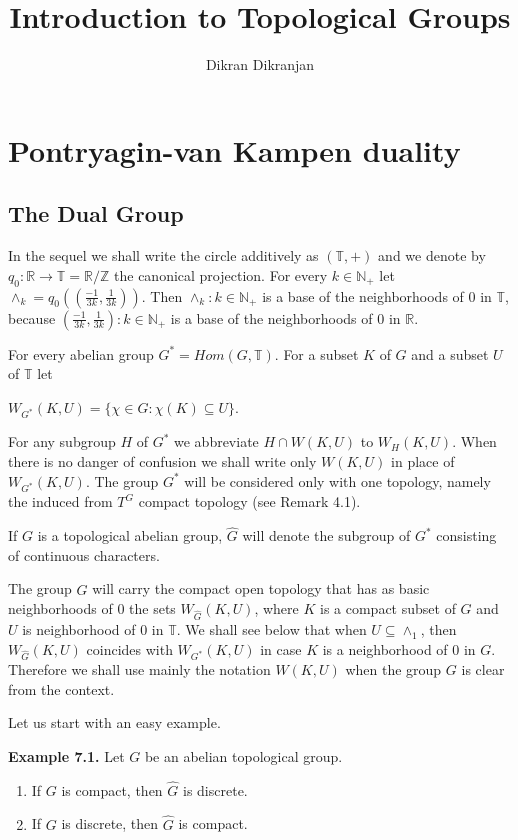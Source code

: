 \documentclass[12pt]{article}
\title{Introduction to Topological Groups}
\author{Dikran Dikranjan}
\begin{document}
\section{Pontryagin-van Kampen duality}

\subsection{The Dual Group}


In the sequel we shall write the circle additively as $(\mathbb{T}, +)$ and we denote by $q_0 : \mathbb{R} \to \mathbb{T} = \mathbb{R}/\mathbb{Z}$ the canonical
projection. For every $k \in \mathbb{N}_+$ let $\wedge_k = q_0((\frac{-1}{3k},\frac{1}{3k}))$. Then ${\wedge_k : k \in \mathbb{N}_+}$ is a base of the neighborhoods of 0
in $\mathbb{T}$, because ${(\frac{-1}{3k}, \frac{1}{3k}) : k \in \mathbb{N}_+}$ is a base of the neighborhoods of 0 in $\mathbb{R}$.


    For every abelian group $G^* = Hom (G,\mathbb{T})$. For a subset $K$ of $G$ and a subset $U$ of $\mathbb{T}$ let


        $W_{G^*} (K, U) = \{\chi \in G : \chi(K) \subseteq U\}$.


    For any subgroup $H$ of $G^*$ we abbreviate $H \cap W(K, U)$ to $W_H (K, U)$. When there is no danger of confusion
we shall write only $W(K, U)$ in place of $W_{G^*} (K, U)$. The group $G^*$ will be considered only with one topology,
namely the induced from ${T}^G$ compact topology (see Remark 4.1).


    If $G$ is a topological abelian group, $\hat{G}$ will denote the subgroup of $G^*$ consisting of continuous characters.


    The group $\hat{G}$ will carry the compact open topology that has as basic neighborhoods of 0 the sets $W_{\hat{G}}(K, U)$,
where $K$ is a compact subset of $G$ and $U$ is neighborhood of 0 in $\mathbb{T}$. We shall see below that when $U \subseteq \wedge_1$,
then $W_{\hat{G}}(K, U)$ coincides with $W_{G^*} (K, U)$ in case $K$ is a neighborhood of 0 in $G$. Therefore we shall use mainly
the notation $W(K, U)$ when the group $G$ is clear from the context.


    Let us start with an easy example.


\textbf{Example 7.1.} Let $G$  be an abelian topological group.


    \begin{enumerate}

        \item If $G$ is compact, then $\hat{G}$ is discrete.

        \item If $G$ is discrete, then $\hat{G}$ is compact.

    \end{enumerate}
\end{document}
